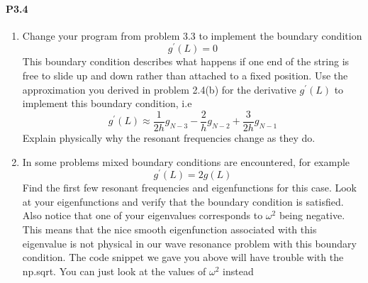 \documentclass{book}
\theoremstyle{plain}
\theoremstyle{definition}
\numberwithin{exm}{chapter}
\theoremstyle{remark}
\theoremstyle{summary}
\theoremstyle{overview}
\begin{document}
\paragraph*{P3.4}
\begin{enumerate}[label=(\alph*)]
	\item Change your program from problem 3.3 to implement the boundary
condition  \begin{equation*}
		g^\prime(L) = 0
				\end{equation*}
				This boundary condition describes what happens if one end of the
string is free to slide up and down rather than attached to a fixed
position. Use the approximation you derived in problem 2.4(b) for the
derivative $g^\prime(L)$ to implement this boundary condition, i.e
\begin{equation*}
		g^\prime(L) \approx \frac{1}{2h}g_{N-3} - \frac{2}{h}g_{N-2} + \frac{3}{2h}g_{N-1}
				\end{equation*}Explain physically why the resonant frequencies change as they do.
				\item In some problems mixed boundary conditions are encountered, for
example\begin{equation*}
		g^\prime(L) = 2g(L)
				\end{equation*}Find the first few resonant frequencies and eigenfunctions for this
case. Look at your eigenfunctions and verify that the boundary condition is satisfied. Also notice that one of your eigenvalues corresponds
to $\omega^2$ being negative. This means that the nice smooth eigenfunction
associated with this eigenvalue is not physical in our wave resonance
problem with this boundary condition. The code snippet we gave you
above will have trouble with the np.sqrt. You can just look at the
values of $\omega^2$ instead
\end{enumerate}
\end{document}
